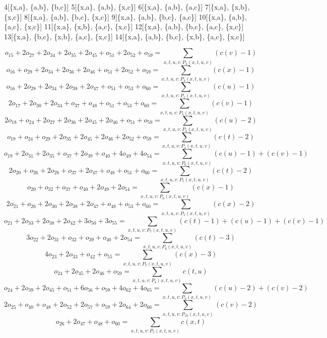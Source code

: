4[\{x,a\}, \{a,b\}, \{b,c\}]
5[\{x,a\}, \{a,b\}, \{x,c\}]
6[\{x,a\}, \{a,b\}, \{a,c\}]
7[\{x,a\}, \{x,b\}, \{x,c\}]
8[\{x,a\}, \{a,b\}, \{b,c\}, \{x,c\}]
9[\{x,a\}, \{a,b\}, \{b,c\}, \{a,c\}]
10[\{x,a\}, \{a,b\}, \{a,c\}, \{x,c\}]
11[\{x,a\}, \{x,b\}, \{a,c\}, \{x,c\}]
12[\{x,a\}, \{a,b\}, \{b,c\}, \{a,c\}, \{x,c\}]
13[\{x,a\}, \{b,c\}, \{x,b\}, \{a,c\}, \{x,c\}]
14[\{x,a\}, \{a,b\}, \{b,c\}, \{x,b\}, \{a,c\}, \{x,c\}]

\[o_{15} + 2o_{27} + 2o_{34} + 2o_{35} + 2o_{45} + o_{51} + 2o_{52} + o_{59} = \sum\limits_{x,t,u,v:P_{4} (x,t,u,v)} ( c( v ) - 1 ) \]
\[o_{16} + o_{29} + 2o_{34} + 2o_{36} + 2o_{46} + o_{51} + 2o_{52} + o_{59} = \sum\limits_{x,t,u,v:P_{4} (x,t,u,v)} ( c( x ) - 1 ) \]
\[o_{16} + 2o_{28} + 2o_{34} + 2o_{38} + 2o_{47} + o_{51} + o_{53} + o_{60} = \sum\limits_{x,t,u,v:P_{5} (x,t,u,v)} ( c( u ) - 1 ) \]
\[2o_{17} + 2o_{30} + 2o_{34} + o_{37} + o_{48} + o_{51} + o_{53} + o_{60} = \sum\limits_{x,t,u,v:P_{5} (x,t,u,v)} ( c( v ) - 1 ) \]
\[2o_{18} + o_{24} + 2o_{27} + 2o_{36} + 2o_{45} + 2o_{46} + o_{51} + o_{59} = \sum\limits_{x,t,u,v:P_{4} (x,t,u,v)} ( c( u ) - 2 ) \]
\[o_{19} + o_{24} + o_{29} + 2o_{35} + 2o_{45} + 2o_{46} + 2o_{52} + o_{59} = \sum\limits_{x,t,u,v:P_{4} (x,t,u,v)} ( c( t ) - 2 ) \]
\[o_{19} + 2o_{31} + 2o_{35} + o_{37} + 2o_{39} + o_{40} + 4o_{49} + 4o_{54} = \sum\limits_{x,t,u,v:P_{6} (x,t,u,v)} ( c( u ) - 1 ) + ( c( v ) - 1 ) \]
\[2o_{20} + o_{26} + 2o_{28} + o_{37} + 2o_{47} + o_{48} + o_{51} + o_{60} = \sum\limits_{x,t,u,v:P_{5} (x,t,u,v)} ( c( t ) - 2 ) \]
\[o_{20} + o_{32} + o_{37} + o_{40} + 2o_{49} + 2o_{54} = \sum\limits_{x,t,u,v:P_{6} (x,t,u,v)} ( c( x ) - 1 ) \]
\[2o_{21} + o_{26} + 2o_{30} + 2o_{38} + 2o_{47} + o_{48} + o_{53} + o_{60} = \sum\limits_{x,t,u,v:P_{5} (x,t,u,v)} ( c( x ) - 2 ) \]
\[o_{21} + 2o_{33} + 2o_{38} + 2o_{42} + 3o_{50} + 3o_{55} = \sum\limits_{x,t,u,v:P_{7} (x,t,u,v)} ( c( t ) - 1 ) + ( c( u ) - 1 ) + ( c( v ) - 1 ) \]
\[3o_{22} + 2o_{31} + o_{32} + o_{39} + o_{40} + 2o_{54} = \sum\limits_{x,t,u,v:P_{6} (x,t,u,v)} ( c( t ) - 3 ) \]
\[4o_{23} + 2o_{33} + o_{42} + o_{55} = \sum\limits_{x,t,u,v:P_{7} (x,t,u,v)} ( c( x ) - 3 ) \]
\[o_{24} + 2o_{45} + 2o_{46} + o_{59} = \sum\limits_{x,t,u,v:P_{4} (x,t,u,v)} c( t, u ) \]
\[o_{24} + 2o_{39} + 2o_{45} + o_{51} + 6o_{56} + o_{59} + 4o_{62} + 4o_{65} = \sum\limits_{x,t,u,v:P_{9} (x,t,u,v)} ( c( u ) - 2 ) + ( c( v ) - 2 ) \]
\[2o_{25} + o_{40} + o_{48} + 2o_{52} + 2o_{57} + o_{59} + 2o_{64} + 2o_{66} = \sum\limits_{x,t,u,v:P_{10} (x,t,u,v)} ( c( v ) - 2 ) \]
\[o_{26} + 2o_{47} + o_{48} + o_{60} = \sum\limits_{x,t,u,v:P_{5} (x,t,u,v)} c( x, t ) \]
